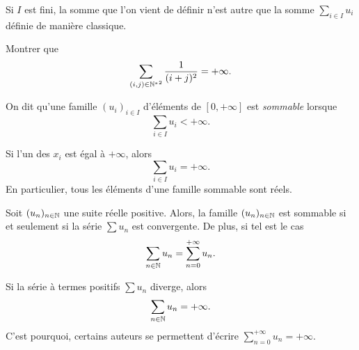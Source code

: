 \documentclass{magnolia}
\begin{document}
\begin{remarqueUnique}
\remarque Si $I$ est fini, la somme que l'on vient de définir n'est autre que la somme
  $\sum_{i\in I} u_i$ définie de manière classique.
\end{remarqueUnique}

\begin{exoUnique}
\exo Montrer que
  \[\sum_{(i,j)\in{\mathbb{N}^*}^2} \frac{1}{(i+j)^2}=+\infty.\]
\end{exoUnique}

\begin{definition}
On dit qu'une famille $(u_i)_{i\in I}$ d'éléments de $[0,+\infty]$ est \emph{sommable} lorsque
\[\sum_{i\in I} u_i < +\infty.\]
\end{definition}

\begin{remarqueUnique}
\remarque Si l'un des $x_i$ est égal à $+\infty$, alors
  \[\sum_{i\in I} u_i=+\infty.\]
  En particulier, tous les éléments d'une famille sommable sont réels.
\end{remarqueUnique}


\begin{proposition}
Soit $(u_n)_{n\in\mathbb{N}}$ une suite réelle positive. Alors, la famille $(u_n)_{n\in\mathbb{N}}$ est
sommable si et seulement si la série $\sum u_n$ est convergente. De plus, si tel est le
cas
\[\sum_{n\in\mathbb{N}} u_n=\sum_{n=0}^{+\infty} u_n.\]
\end{proposition}

\begin{remarqueUnique}
\remarque Si la série à termes positifs $\sum u_n$ diverge, alors
  \[\sum_{n\in\mathbb{N}} u_n=+\infty.\]
  C'est pourquoi, certains auteurs se permettent d'écrire
  $\sum_{n=0}^{+\infty} u_n=+\infty$.
\end{remarqueUnique}
\end{document}
